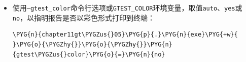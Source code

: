 \begin{itemize}
\begin{codeblockbg}
\begin{Verbatim}[commandchars=\\\{\},breaklines=true,breakanywhere=true,fontsize=\codefont,xleftmargin=17bp]
\PYG{+w}{              }\PYG{n}{classname}\PYG{o}{=}\PYG{l+s}{\PYGZdq{}}\PYG{l+s}{Sample}\PYG{l+s}{\PYGZdq{}}\PYG{o}{\PYGZgt{}}
\PYG{+w}{      }\PYG{o}{\PYGZlt{}}\PYG{n}{failure}\PYG{+w}{ }\PYG{n}{message}\PYG{o}{=}\PYG{l+s}{\PYGZdq{}}\PYG{l+s}{f:/chapter11gt\PYGZus{}05/main.cpp:6}
\PYG{+w}{ }\PYG{n+nl}{Expected}\PYG{p}{:}\PYG{+w}{ }\PYG{n}{a}
\PYG{+w}{ }\PYG{n}{Which}\PYG{+w}{ }\PYG{n}{is}\PYG{o}{:}\PYG{+w}{ }\PYG{l+m+mi}{42}
\PYG{+w}{ }\PYG{n}{To}\PYG{+w}{ }\PYG{n}{be}\PYG{+w}{ }\PYG{n}{equal}\PYG{+w}{ }\PYG{n}{to}\PYG{o}{:}\PYG{+w}{ }\PYG{l+m+mi}{0}\PYG{l+s}{\PYGZdq{}}\PYG{l+s}{ type=}\PYG{l+s}{\PYGZdq{}}\PYG{l+s}{\PYGZdq{}}\PYG{l+s}{\PYGZgt{}}
\PYG{+w}{        }\PYG{o}{\PYGZlt{}}\PYG{o}{!}\PYG{p}{[}\PYG{n}{CDATA}\PYG{p}{[}\PYG{n}{f}\PYG{o}{:}\PYG{o}{/}\PYG{n}{chapter11gt\PYGZus{}05}\PYG{o}{/}\PYG{n}{main}\PYG{p}{.}\PYG{n}{cpp}\PYG{o}{:}\PYG{l+m+mi}{6}
\PYG{+w}{              }\PYG{n+nl}{Expected}\PYG{p}{:}\PYG{+w}{ }\PYG{n}{a}
\PYG{+w}{              }\PYG{n}{Which}\PYG{+w}{ }\PYG{n}{is}\PYG{o}{:}\PYG{+w}{ }\PYG{l+m+mi}{42}
\PYG{+w}{        }\PYG{n}{To}\PYG{+w}{ }\PYG{n}{be}\PYG{+w}{ }\PYG{n}{equal}\PYG{+w}{ }\PYG{n}{to}\PYG{o}{:}\PYG{+w}{ }\PYG{l+m+mi}{0}\PYG{p}{]}\PYG{p}{]}\PYG{o}{\PYGZgt{}}\PYG{o}{\PYGZlt{}}\PYG{o}{/}\PYG{n}{failure}\PYG{o}{\PYGZgt{}}
\PYG{+w}{    }\PYG{o}{\PYGZlt{}}\PYG{o}{/}\PYG{n}{testcase}\PYG{o}{\PYGZgt{}}
\PYG{+w}{  }\PYG{o}{\PYGZlt{}}\PYG{o}{/}\PYG{n}{testsuite}\PYG{o}{\PYGZgt{}}
\PYG{o}{\PYGZlt{}}\PYG{o}{/}\PYG{n}{testsuites}\PYG{o}{\PYGZgt{}}
\end{Verbatim}
\end{codeblockbg}



\item 使用\texttt{--\allowbreak{}gtest\_\allowbreak{}color}命令行选项或\texttt{GTEST\_\allowbreak{}COLOR}环境变量，取值\texttt{auto}、\texttt{yes}或\texttt{no}，以指明报告是否以彩色形式打印到终端：



\begin{codeblockbg}
\begin{Verbatim}[commandchars=\\\{\},breaklines=true,breakanywhere=true,fontsize=\codefont,xleftmargin=17bp]
\PYG{n}{chapter11gt\PYGZus{}05}\PYG{p}{.}\PYG{n}{exe}\PYG{+w}{ }\PYG{o}{\PYGZhy{}}\PYG{o}{\PYGZhy{}}\PYG{n}{gtest\PYGZus{}color}\PYG{o}{=}\PYG{n}{no}
\end{Verbatim}
\end{codeblockbg}




\end{itemize}
